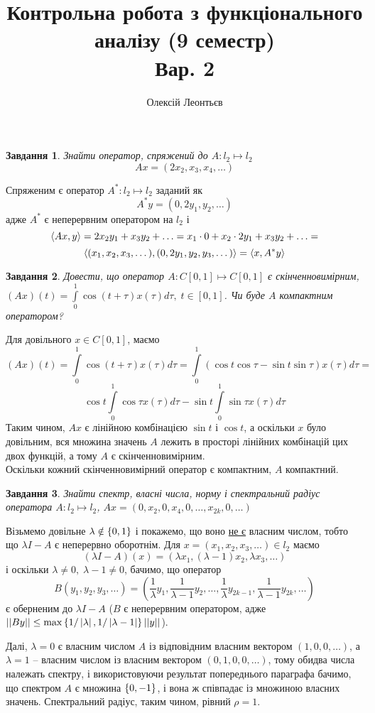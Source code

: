 \documentclass[10pt]{article}
\title{Контрольна робота з функціонального аналізу (9 семестр)\\Вар. 2}
\author{Олексій Леонтьєв}
\newtheorem{prob}{Завдання}
\let\oldint\int
\renewcommand{\int}{\oldint\limits}
\begin{document}
\maketitle
\begin{prob}Знайти оператор, спряжений до $A:l_2\mapsto l_2$\[Ax=({2}x_2,x_3,x_4,\dots)\]\end{prob}
	Спряженим є оператор $A^*:l_2\mapsto l_2$ заданий як
	\[A^*y=(0,2y_1,y_2,\dots)\]
	адже $A^*$ є неперервним оператором на $l_2$ і
	\[\left<Ax,y\right>=2x_2{y_1}+x_3{y_2}+\hdots=
	x_1\cdot 0+x_2\cdot{{2}y_1}+x_3{y_2}+\hdots=\]
	\[\left<(x_1,x_2,x_3,\dots),(0,{2}y_1,y_2,y_3,\dots)\right>=\left<x,A^*y\right>\]
\begin{prob}Довести, що оператор $A:C[0,1]\mapsto C[0,1]$ є скінченновимірним, $(Ax)(t)=\int_0^{1}\cos(t+\tau)x(\tau)d\tau,\;t\in[0,1]$.
	Чи буде $A$ компактним оператором?\end{prob}
	Для довільного $x\in C[0,1]$, маємо
	\[(Ax)(t)=\int_0^{1}\cos(t+\tau)x(\tau)d\tau=\int_0^{1}\left(\cos t\cos\tau-\sin t\sin\tau\right)x(\tau)d\tau=\]
	\[\cos t\int_0^{1}\cos\tau x(\tau)d\tau-\sin t\int_0^{1}\sin\tau x(\tau)d\tau\]
	Таким чином, $Ax$ є лінійною комбінацією $\sin t$ і $\cos t$, а оскільки $x$ було довільним, вся множина значень $A$ лежить в просторі
	лінійних комбінацій цих двох функцій, а тому $A$ є скінченновимірним.\\
	Оскільки кожний скінченновимірний оператор є компактним, $A$ компактний.
	\begin{prob}Знайти спектр, власні числа, норму і спектральний радіус оператора $A:l_2\mapsto l_2$, $Ax=(0,x_2,0,x_4,0,\hdots,x_{2k},0,\hdots)
		$\end{prob}
	Візьмемо довільне $\lambda\notin\left\{0,1\right\}$ і покажемо, що воно \uline{не є} власним числом, тобто що $\lambda I-A$ є неперервно
	оборотнім. Для $x=(x_1,x_2,x_3,\hdots)\in l_2$ маємо
	\[(\lambda I-A)(x)=(\lambda x_1,(\lambda-1)x_2,\lambda x_3,\hdots)\]
	і оскільки $\lambda\neq0,\;\lambda-1\neq0$,
	бачимо, що оператор \[B(y_1,y_2,y_3,\hdots)=(\frac{1}{\lambda}y_1,\frac{1}{\lambda-1}y_2,\hdots,\frac{1}{\lambda}y_{2k-1},\frac{1}{\lambda-1
	}y_{2k},\hdots)\]
	є оберненим до $\lambda I-A$ ($B$ є неперервним оператором, адже 
	$\mynorm{By}\leq\max\mycbra{1/\myabs{\lambda},1/\myabs{\lambda-1}}\mynorm{y}$).

	Далі, $\lambda=0$ є власним числом $A$ із відповідним власним вектором $(1,0,0,\hdots)$, а $\lambda=1$ -- власним числом із власним вектором
	$(0,1,0,0,\hdots)$, тому обидва числа належать спектру, і використовуючи результат попереднього параграфа бачимо, що спектром $A$ є
	множина $\left\{0,-1\right\}$, і вона ж співпадає із множиною власних значень. Спектральний радіус, таким чином, рівний $\rho=1$.
\end{document}
